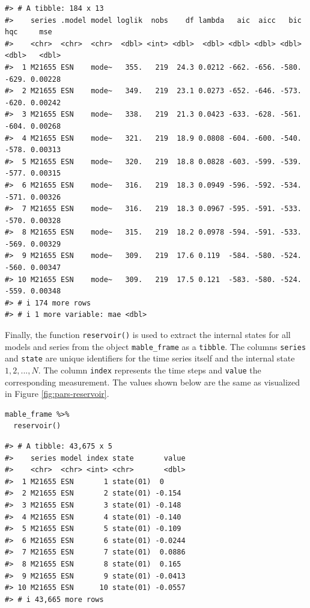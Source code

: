 \begin{verbatim}
#> # A tibble: 184 x 13
#>    series .model model loglik  nobs    df lambda   aic  aicc   bic   hqc     mse
#>    <chr>  <chr>  <chr>  <dbl> <int> <dbl>  <dbl> <dbl> <dbl> <dbl> <dbl>   <dbl>
#>  1 M21655 ESN    mode~   355.   219  24.3 0.0212 -662. -656. -580. -629. 0.00228
#>  2 M21655 ESN    mode~   349.   219  23.1 0.0273 -652. -646. -573. -620. 0.00242
#>  3 M21655 ESN    mode~   338.   219  21.3 0.0423 -633. -628. -561. -604. 0.00268
#>  4 M21655 ESN    mode~   321.   219  18.9 0.0808 -604. -600. -540. -578. 0.00313
#>  5 M21655 ESN    mode~   320.   219  18.8 0.0828 -603. -599. -539. -577. 0.00315
#>  6 M21655 ESN    mode~   316.   219  18.3 0.0949 -596. -592. -534. -571. 0.00326
#>  7 M21655 ESN    mode~   316.   219  18.3 0.0967 -595. -591. -533. -570. 0.00328
#>  8 M21655 ESN    mode~   315.   219  18.2 0.0978 -594. -591. -533. -569. 0.00329
#>  9 M21655 ESN    mode~   309.   219  17.6 0.119  -584. -580. -524. -560. 0.00347
#> 10 M21655 ESN    mode~   309.   219  17.5 0.121  -583. -580. -524. -559. 0.00348
#> # i 174 more rows
#> # i 1 more variable: mae <dbl>
\end{verbatim}

Finally, the function \texttt{reservoir()} is used to extract the internal states for all models and series from the object \texttt{mable\_frame} as a \texttt{tibble}. The columns \texttt{series} and \texttt{state} are unique identifiers for the time series itself and the internal state \(1, 2, ..., N\). The column \texttt{index} represents the time steps and \texttt{value} the corresponding measurement. The values shown below are the same as visualized in Figure \ref{fig:pars-reservoir}.

\begin{verbatim}
mable_frame %>%
  reservoir()
\end{verbatim}

\begin{verbatim}
#> # A tibble: 43,675 x 5
#>    series model index state       value
#>    <chr>  <chr> <int> <chr>       <dbl>
#>  1 M21655 ESN       1 state(01)  0     
#>  2 M21655 ESN       2 state(01) -0.154 
#>  3 M21655 ESN       3 state(01) -0.148 
#>  4 M21655 ESN       4 state(01) -0.140 
#>  5 M21655 ESN       5 state(01) -0.109 
#>  6 M21655 ESN       6 state(01) -0.0244
#>  7 M21655 ESN       7 state(01)  0.0886
#>  8 M21655 ESN       8 state(01)  0.165 
#>  9 M21655 ESN       9 state(01) -0.0413
#> 10 M21655 ESN      10 state(01) -0.0557
#> # i 43,665 more rows
\end{verbatim}

